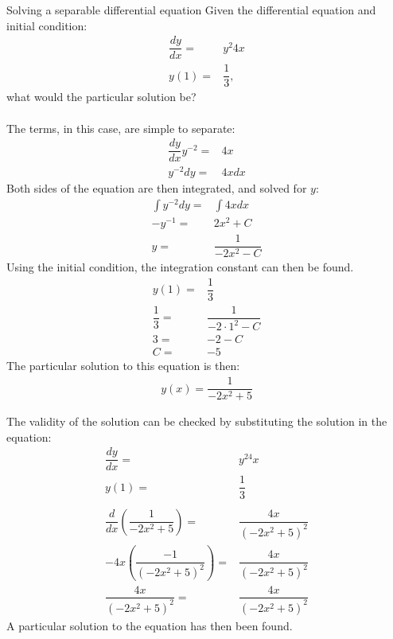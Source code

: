 \begin{example}{Solving a separable differential equation}{}
Given the differential equation and initial condition:
\begin{align*}
	\dfrac{dy}{dx} =& y^2 4x \\
	y(1) =& \dfrac{1}{3},
\end{align*}
what would the particular solution be?
\\ \\
The terms, in this case, are simple to separate: 
\begin{align*}
	\dfrac{dy}{dx} y^{-2} =& 4x \\
	y^{-2} dy =& 4x dx 
\end{align*}
Both sides of the equation are then integrated, and solved for $y$:
\begin{align*}
	\int{y^{-2} dy} =& \int{4x dx} \\
	-y^{-1} =& 2x^2 +C \\
	y =& \dfrac{1}{-2x^2-C}
\end{align*}
Using the initial condition, the integration constant can then be found.
\begin{align*}
	y(1) =& \dfrac{1}{3} \\
	\dfrac{1}{3} =& \dfrac{1}{-2 \cdot 1^2-C} \\
	3 =& -2-C \\
	C =& -5
\end{align*}
The particular solution to this equation is then:
\begin{align*}
	y(x) = \dfrac{1}{-2x^2+5}
\end{align*}

The validity of the solution can be checked by substituting the solution in the equation:
\begin{align*}
	\dfrac{dy}{dx} =& y^24x \\
	y(1) =& \dfrac{1}{3}  \\
	\\
	\dfrac{d}{dx} \left(\dfrac{1}{-2x^2+5}\right) =& \dfrac{4x}{(-2x^2+5)^2} \\
	-4x\left(\dfrac{-1}{(-2x^2+5)^2}\right)  =& \dfrac{4x}{(-2x^2+5)^2} \\
	\dfrac{4x}{(-2x^2+5)^2} =& \dfrac{4x}{(-2x^2+5)^2}
\end{align*}
A particular solution to the equation has then been found.
\end{example}
